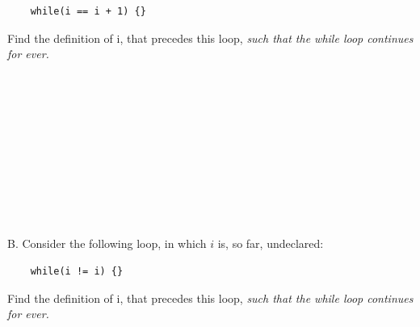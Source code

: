 \documentclass[12pt]{article}
\begin{document}
\begin{lstlisting}
    while(i == i + 1) {}
\end{lstlisting}
Find the definition of i, that precedes this loop, 
\textit{such that the while loop continues for ever.}
\\\\\\\\\\\\\\\\\\\\\\\\
B. Consider the following loop, in which $i$ is, so far, undeclared:\\
\begin{lstlisting}
    while(i != i) {}
\end{lstlisting}
Find the definition of i, that precedes this loop, 
\textit{such that the while loop continues for ever.}
\end{document}
